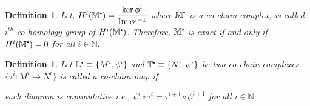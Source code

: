 \documentclass[11pt]{amsart}
\newtheorem{defn}[theorem]{Definition}
\newcommand{\NN}{\mathbb N}
\newcommand\sbullet[1][.5]{\mathbin{\vcenter{\hbox{\scalebox{#1}{$\bullet$}}}}}
\begin{document}
\begin{defn}

Let, $H^i(\mathbb{M}^{\sbullet})=\dfrac{\operatorname{ker}\phi^{i}}{\operatorname{Im}\phi^{i-1}}$ where $\mathbb{M}^{\sbullet}$ is a co-chain complex, is called $i^{th}$ co-homology group of $H^i(\mathbb{M}^{\sbullet})$. Therefore, $\mathbb{M}^{\sbullet} $ is exact if and only if $H^i(\mathbb{M}^{\sbullet})=0$ for all $i\in{\NN}.$

\end{defn}

\begin{defn}

Let $\mathbb{L}^{\sbullet}\equiv \{M^i,\phi^i\}$ and $\mathbb{T}^{\sbullet}\equiv\{N^i,\psi^i\}$ be two co-chain complexes. $\{\tau^i:M^i\to N^i\}$ is called a co-chain map if \begin{center}

\end{center}
each diagram is commutative i.e., $\psi^i\circ \tau^i=\tau^{i+1}\circ \phi^{i+1}$ for all $i\in{\NN}.$

\end{defn}
\end{document}
